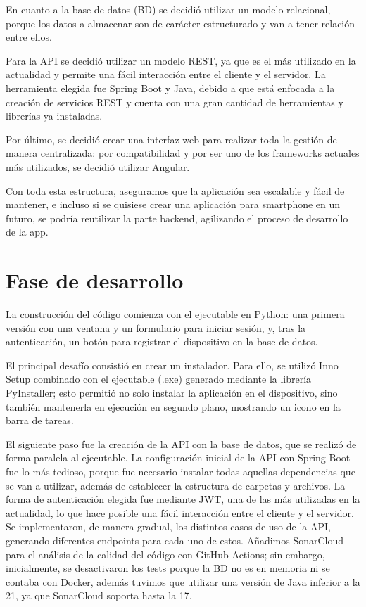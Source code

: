 En cuanto a la base de datos (BD) se decidió utilizar un modelo relacional, porque los datos a almacenar son de
carácter estructurado y van a tener relación entre ellos.

Para la API se decidió utilizar un modelo REST, ya que es el más utilizado en la actualidad y permite una fácil
interacción entre el cliente y el servidor.
La herramienta elegida fue Spring Boot y Java, debido a que está enfocada a la creación de servicios REST y cuenta con una
gran cantidad de herramientas y librerías ya instaladas.

Por último, se decidió crear una interfaz web para realizar toda la gestión de manera centralizada: por compatibilidad
y por ser uno de los frameworks actuales más utilizados, se decidió utilizar Angular.

Con toda esta estructura, aseguramos que la aplicación sea escalable y fácil de mantener, e incluso si se quisiese
crear una aplicación para smartphone en un futuro, se podría reutilizar la parte backend, agilizando el proceso de
desarrollo de la app.

\section{Fase de desarrollo}\label{sec:fase-de-desarrollo}

La construcción del código comienza con el ejecutable en Python: una primera versión con una ventana
y un formulario para iniciar sesión, y, tras la autenticación, un botón para registrar el dispositivo
en la base de datos.

El principal desafío consistió en crear un instalador.
Para ello, se utilizó Inno Setup combinado con el ejecutable (.exe) generado mediante la librería PyInstaller; esto
permitió no solo instalar la aplicación en el dispositivo, sino también mantenerla en ejecución en segundo plano,
mostrando un icono en la barra de tareas.


El siguiente paso fue la creación de la API con la base de datos, que se realizó de forma paralela al ejecutable.
La configuración inicial de la API con Spring Boot fue lo más tedioso, porque fue necesario instalar todas aquellas
dependencias que se van a utilizar, además de establecer la estructura de carpetas y archivos.
La forma de autenticación elegida fue mediante JWT, una de las más utilizadas en la actualidad, lo que hace posible
una fácil interacción entre el cliente y el servidor.
Se implementaron, de manera gradual, los distintos casos de uso de la API, generando diferentes endpoints para
cada uno de estos.
Añadimos SonarCloud para el análisis de la calidad del código con GitHub Actions; sin embargo, inicialmente, se
desactivaron los tests porque la BD no es en memoria ni se contaba con Docker, además tuvimos que utilizar una versión
de Java inferior a la 21, ya que SonarCloud soporta hasta la 17.

